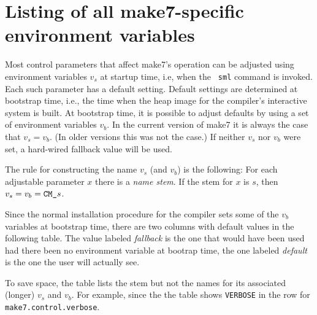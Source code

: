 
\section{Listing of all make7-specific environment variables}

Most control parameters that affect make7's operation can be adjusted
using environment variables $v_s$ at startup time, i.e, when the {\tt
sml} command is invoked.  Each such parameter has a default setting.
Default settings are determined at bootstrap time, i.e., the time when
the heap image for the compiler's interactive system is
built.  At bootstrap time, it is possible to
adjust defaults by using a set of environment variables $v_b$.  In the
current version of make7 it is always the case that $v_s = v_b$.  (In
older versions this was not the case.) If neither $v_s$ nor $v_b$ were
set, a hard-wired fallback value will be used.

The rule for constructing the name $v_s$ (and $v_b$) is the
following: For each adjustable parameter $x$ there is a {\em name
stem}.  If the stem for $x$ is $s$, then $v_s = v_b = \mbox{\tt CM\_}s$.

Since the normal installation procedure for the compiler sets some of the
$v_b$ variables at bootstrap time, there are two columns with default
values in the following table.  The value labeled {\em fallback} is
the one that would have been used had there been no environment
variable at bootrap time, the one labeled {\em default} is the one the
user will actually see.

To save space, the table lists the stem but not the names for its
associated (longer) $v_s$ and $v_b$.  For example, since the the table
shows {\tt VERBOSE} in the row for {\tt make7.control.verbose}.

